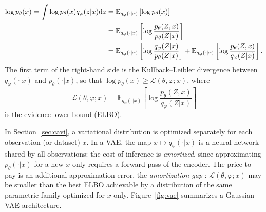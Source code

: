 \documentclass[english,graybox,envcountchap,envcountsame,sectrefs,shortlabels]{svmono}
\theoremstyle{style}
\begin{document}
\begin{align*}
\log p_\theta(x) = \int \log p_\theta(x) q_{\varphi}(z|x) \mathrm{d} z &= \mathbb{E}_{q_{\varphi}(\cdot|x)}\left[\log p_\theta(x)\right] \\
&= \mathbb{E}_{q_{\varphi}(\cdot|x)}\left[\log \frac{p_\theta(Z,x)}{p_\theta(Z|x)}\right] \\
&= \mathbb{E}_{q_{\varphi}(\cdot|x)}\left[\log \frac{q_{\varphi}(Z|x)}{p_\theta(Z|x)}\right]  + \mathbb{E}_{q_{\varphi}(\cdot|x)}\left[\log \frac{p_\theta(Z,x)}{q_{\varphi}(Z|x)}\right] .
\end{align*}
The first term of the right-hand side is the Kullback--Leibler divergence between $q_{\varphi}(\cdot|x)$ and $p_\theta(\cdot|x)$, so that $\log p_\theta(x)\geq \mathcal{L}(\theta,\varphi;x)$, where
$$
\mathcal{L}(\theta,\varphi;x) = \mathbb{E}_{q_{\varphi}(\cdot|x)}\left[\log \frac{p_\theta(Z,x)}{q_{\varphi}(Z|x)}\right]
$$
is the evidence lower bound (ELBO).

In Section~\ref{sec:cavi}, a variational distribution is optimized separately for each observation (or dataset) $x$. In a VAE, the map $x\mapsto q_\varphi(\cdot|x)$ is a neural network shared by all observations: the cost of inference is \emph{amortized}, since approximating $p_\theta(\cdot|x)$ for a new $x$ only requires a forward pass of the encoder. The price to pay is an additional approximation error, the \emph{amortization gap} \cite{cremer2018inference}: $\mathcal{L}(\theta,\varphi;x)$ may be smaller than the best ELBO achievable by a distribution of the same parametric family optimized for $x$ only. Figure~\ref{fig:vae} summarizes a Gaussian VAE architecture.
\end{document}
